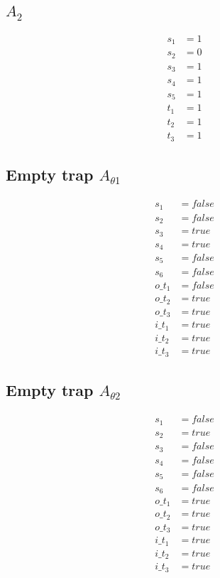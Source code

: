 \documentclass{article}
\begin{document}
\subsection{$A_2$}
\begin{align*}
  s_1 &= 1 \\
  s_2 &= 0 \\
  s_3 &= 1 \\
  s_4 &= 1 \\
  s_5 &= 1 \\
  t_1 &= 1 \\
  t_2 &= 1 \\
  t_3 &= 1
\end{align*}

\subsection{Empty trap $A_{\theta 1}$}
\begin{align*}
  s_1 &= false \\
  s_2 &= false \\
  s_3 &= true \\
  s_4 &= true \\
  s_5 &= false \\
  s_6 &= false \\
  o\_t_1 &= false \\
  o\_t_2 &= true \\
  o\_t_3 &= true \\
  i\_t_1 &= true \\
  i\_t_2 &= true \\
  i\_t_3 &= true
\end{align*}

\subsection{Empty trap $A_{\theta 2}$}
\begin{align*}
  s_1 &= false \\
  s_2 &= true \\
  s_3 &= false \\
  s_4 &= false \\
  s_5 &= false \\
  s_6 &= false \\
  o\_t_1 &= true \\
  o\_t_2 &= true \\
  o\_t_3 &= true \\
  i\_t_1 &= true \\
  i\_t_2 &= true \\
  i\_t_3 &= true
\end{align*}
\end{document}
